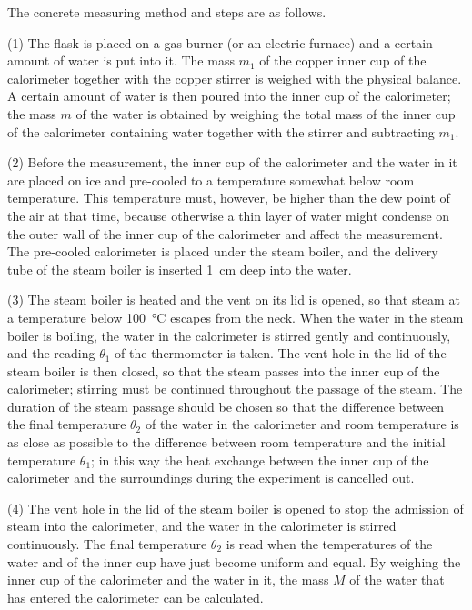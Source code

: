 The concrete measuring method and steps are as follows.

(1) The flask is placed on a gas burner (or an electric furnace) and a certain amount of water is put into it. The mass $m_1$ of the copper inner cup of the calorimeter together with the copper stirrer is weighed with the physical balance. A certain amount of water is then poured into the inner cup of the calorimeter; the mass $m$ of the water is obtained by weighing the total mass of the inner cup of the calorimeter containing water together with the stirrer and subtracting $m_1$.

(2) Before the measurement, the inner cup of the calorimeter and the water in it are placed on ice and pre-cooled to a temperature somewhat below room temperature. This temperature must, however, be higher than the dew point of the air at that time, because otherwise a thin layer of water might condense on the outer wall of the inner cup of the calorimeter and affect the measurement. The pre-cooled calorimeter is placed under the steam boiler, and the delivery tube of the steam boiler is inserted \SI{1}{cm} deep into the water.

(3) The steam boiler is heated and the vent on its lid is opened, so that steam at a temperature below \SI{100}{\celsius} escapes from the neck. When the water in the steam boiler is boiling, the water in the calorimeter is stirred gently and continuously, and the reading $\theta_1$ of the thermometer is taken. The vent hole in the lid of the steam boiler is then closed, so that the steam passes into the inner cup of the calorimeter; stirring must be continued throughout the passage of the steam. The duration of the steam passage should be chosen so that the difference between the final temperature $\theta_2$ of the water in the calorimeter and room temperature is as close as possible to the difference between room temperature and the initial temperature $\theta_1$; in this way the heat exchange between the inner cup of the calorimeter and the surroundings during the experiment is
cancelled out.

(4) The vent hole in the lid of the steam boiler is opened to stop the admission of steam into the calorimeter, and the water in the calorimeter is stirred continuously. The final temperature $\theta_2$ is read when the temperatures of the water and of the inner cup have just become uniform and equal. By weighing the inner cup of the calorimeter and the water in it, the mass $M$ of the water that has entered the calorimeter can be calculated.

